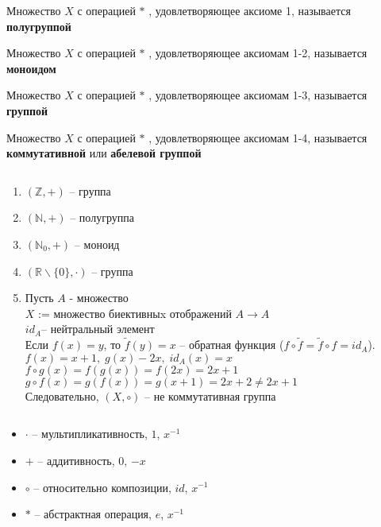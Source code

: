 \documentclass[12pt]{report}
\begin{document}
\begin{defn}
Множество $X$ с операцией $*$ , удовлетворяющее  аксиоме 1, называется {\bf полугруппой}
\end{defn}

\begin{defn}
Множество $X$ с операцией $*$ , удовлетворяющее  аксиомам 1-2, называется {\bf моноидом}
\end{defn}

\begin{defn}
Множество $X$ с операцией $*$ , удовлетворяющее  аксиомам 1-3, называется {\bf группой}
\end{defn}

\begin{defn}
Множество $X$ с операцией $*$ , удовлетворяющее  аксиомам 1-4, называется {\bf коммутативной} или {\bf абелевой группой}
\end{defn}

\begin{exs}$ $
\begin{enumerate}
    \item $(\mathbb{Z}, + )$ -- группа
    \item $(\mathbb{N}, + )$ -- полугруппа
    \item $(\mathbb N_0 , +)$ -- моноид
    \item $(\mathbb R \backslash \{0\}, \cdot)$ -- группа
    \item Пусть $A$ - множество\\
	$X$ := множество биективныx отображений $A \to A$\\
	$id_A $-- нейтральный элемент\\
	Если $f(x) = y$, то $\tilde f (y) = x$ -- обратная функция ($f \circ \tilde f = \tilde f \circ f = id_A$).\\
	$f(x) = x+1,\; g(x) - 2x,\;id_A(x)=x$\\
	$f \circ g(x) = f(g(x)) = f(2x) = 2x + 1$\\
	$g \circ f(x) = g(f(x)) = g(x+1) = 2x + 2 \ne 2x+1$\\
	Следовательно, $(X, \circ)$ -- не коммутативная группа
\end{enumerate}
\end{exs}

\begin{name}$ $
\begin{itemize}
    \item $\cdot$ -- мультипликативность, $1$, $x^{-1}$
    \item $+$ -- аддитивность, $0$, $-x$
    \item $\circ$ -- относительно композиции, $id$, $x^{-1}$
    \item $*$ -- абстрактная операция, $e$, $x^{-1}$
\end{itemize}
\end{name}
\end{document}
